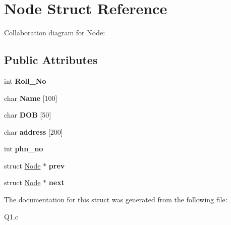 \hypertarget{structNode}{}\section{Node Struct Reference}
\label{structNode}


Collaboration diagram for Node\+:
\subsection*{Public Attributes}
\begin{DoxyCompactItemize}
\item 
\mbox{\label{structNode_aa88c25db6052fc5d0095ada54c4e90a4}} 
int {\bfseries Roll\+\_\+\+No}
\item 
\mbox{\label{structNode_afae9b1addde700ee9b69180676c1c498}} 
char {\bfseries Name} \mbox{[}100\mbox{]}
\item 
\mbox{\label{structNode_a6f120f76883472940cab92bc327f3781}} 
char {\bfseries D\+OB} \mbox{[}50\mbox{]}
\item 
\mbox{\label{structNode_a5108c644cce17eb5d81bd98a963022a6}} 
char {\bfseries address} \mbox{[}200\mbox{]}
\item 
\mbox{\label{structNode_aaa0503a0ff2607be78e4d350768d325f}} 
int {\bfseries phn\+\_\+no}
\item 
\mbox{\label{structNode_aea9fefc3628c3ce98b967e8addf06e88}} 
struct \hyperlink{structNode}{Node} $\ast$ {\bfseries prev}
\item 
\mbox{\label{structNode_af67b110ca1a258b793bf69d306929b22}} 
struct \hyperlink{structNode}{Node} $\ast$ {\bfseries next}
\end{DoxyCompactItemize}


The documentation for this struct was generated from the following file\+:\begin{DoxyCompactItemize}
\item 
Q1.\+c\end{DoxyCompactItemize}
